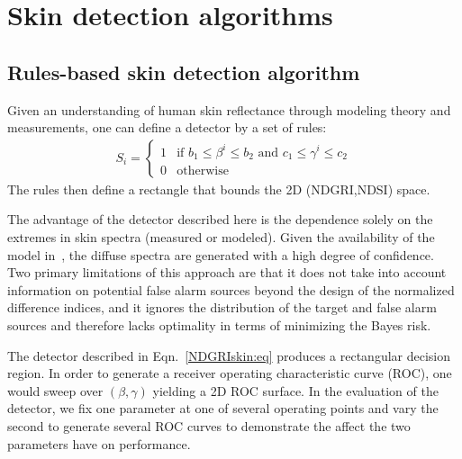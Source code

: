 \documentclass[10pt,journal,cspaper,compsoc]{IEEEtran}
\begin{document}
\section{Skin detection algorithms}
\label{scn:detectors}
\subsection{Rules-based skin detection algorithm}
\label{scn:simple_detector}
Given an understanding of human skin reflectance through modeling theory and measurements, one can define a detector 
by a set of rules:
\begin{align}\label{NDGRIskin:eq}
S_{i} = \left\{
  \begin{array}{ll}
    1 & \mbox{if $b_1\leq \beta^{i} \leq b_2$ and $c_1 \leq \gamma^{i} \leq c_2$}
\\
    0 & \mbox{otherwise}
  \end{array} \right.
\end{align}
\noindent The rules then define a rectangle that bounds the 2D (NDGRI,NDSI) space. 

The advantage of the detector described here is the dependence solely on the extremes in skin spectra (measured or modeled).
Given the availability of the model in~\cite{Nunez8}, the diffuse spectra are generated with a high degree of confidence. 
Two primary limitations of this approach are that it does not take into account information on potential false alarm sources 
beyond the design of the normalized difference indices, and it ignores the distribution of the target and false alarm sources 
and therefore lacks optimality in terms of minimizing the Bayes risk.

The detector described in Eqn.~\ref{NDGRIskin:eq} produces a rectangular decision region.  In order to generate a 
receiver operating characteristic curve (ROC), one would sweep over $\left(\beta,\gamma\right)$ yielding a 
2D ROC surface.  In the evaluation of the detector, we fix one parameter at one of several operating points and vary 
the second to generate several ROC curves to demonstrate the affect the two parameters have on performance.
\end{document}

